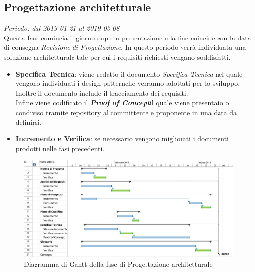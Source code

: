 \subsection{Progettazione architetturale}
\textit{Periodo: dal 2019-01-21 al 2019-03-08} \\
Questa fase comincia il giorno dopo la presentazione e la fine coincide con la data di consegna \textit{Revisione di 
Progettazione}. In questo periodo verrà individuata una soluzione architetturale 
tale per cui i requisiti richiesti vengano soddisfatti.
\begin{itemize}
	\item \textbf{Specifica Tecnica}: viene redatto il documento 
	\textit{Specifica Tecnica} nel quale vengono individuati i design 
	pattern\glosp che verranno adottati per lo sviluppo. Inoltre il documento 
	include il tracciamento dei requisiti.\\
	Infine viene codificato il \textbf{\textit{Proof of Concept}}\glosp il 
	quale viene presentato o condiviso tramite repository al committente e 
	proponente in una data da definirsi.
	\item \textbf{Incremento e Verifica}: se necessario vengono migliorati i 
	documenti prodotti nelle fasi precedenti.
\end{itemize}

\begin{figure}[H]
	\includegraphics[width=0.99\linewidth]{res/images/gantt_pa.jpg}
	\caption{Diagramma di Gantt della fase di Progettazione architetturale}
\end{figure}


